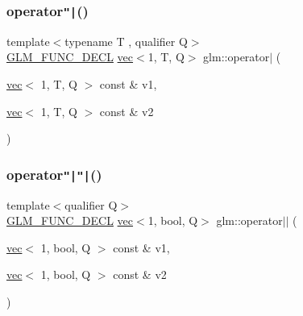 \subsubsection{\texorpdfstring{operator\texttt{"|}()}{operator|()}\hspace{0.1cm}{\footnotesize\ttfamily [3/3]}}
{\footnotesize\ttfamily template$<$typename T , qualifier Q$>$ \\
\hyperlink{setup_8hpp_ab2d052de21a70539923e9bcbf6e83a51}{G\+L\+M\+\_\+\+F\+U\+N\+C\+\_\+\+D\+E\+CL} \hyperlink{structglm_1_1vec}{vec}$<$1, T, Q$>$ glm\+::operator$\vert$ (\begin{DoxyParamCaption}\item[{\hyperlink{structglm_1_1vec}{vec}$<$ 1, T, Q $>$ const \&}]{v1,  }\item[{\hyperlink{structglm_1_1vec}{vec}$<$ 1, T, Q $>$ const \&}]{v2 }\end{DoxyParamCaption})}

\mbox{\label{group__ext__vec1_ga121908a337ee4ab94414dfd4f3518d47}} 
\subsubsection{\texorpdfstring{operator\texttt{"|}\texttt{"|}()}{operator||()}}
{\footnotesize\ttfamily template$<$qualifier Q$>$ \\
\hyperlink{setup_8hpp_ab2d052de21a70539923e9bcbf6e83a51}{G\+L\+M\+\_\+\+F\+U\+N\+C\+\_\+\+D\+E\+CL} \hyperlink{structglm_1_1vec}{vec}$<$1, bool, Q$>$ glm\+::operator$\vert$$\vert$ (\begin{DoxyParamCaption}\item[{\hyperlink{structglm_1_1vec}{vec}$<$ 1, bool, Q $>$ const \&}]{v1,  }\item[{\hyperlink{structglm_1_1vec}{vec}$<$ 1, bool, Q $>$ const \&}]{v2 }\end{DoxyParamCaption})}

\mbox{\label{group__ext__vec1_ga923256ef3abbc940c475ddb5e2bca75b}} 
